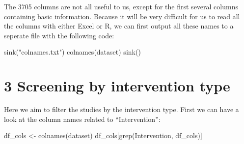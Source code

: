 \documentclass[
]{article}
\newenvironment{Shaded}{\begin{snugshade}}{\end{snugshade}}
\newcommand{\FunctionTok}[1]{\textcolor[rgb]{0.00,0.00,0.00}{#1}}
\newcommand{\NormalTok}[1]{#1}
\newcommand{\OtherTok}[1]{\textcolor[rgb]{0.56,0.35,0.01}{#1}}
\newcommand{\StringTok}[1]{\textcolor[rgb]{0.31,0.60,0.02}{#1}}
\begin{document}
The 3705 columns are not all useful to us, except for the first several
columns containing basic information. Because it will be very difficult
for us to read all the columns with either Excel or R, we can first
output all these names to a seperate file with the following code:

\begin{Shaded}
\begin{Highlighting}[]
\FunctionTok{sink}\NormalTok{(}\StringTok{"colnames.txt"}\NormalTok{)}
\FunctionTok{colnames}\NormalTok{(dataset)}
\FunctionTok{sink}\NormalTok{()}
\end{Highlighting}
\end{Shaded}

\hypertarget{screening-by-intervention-type}{%
\section{3 Screening by intervention
type}\label{screening-by-intervention-type}}

Here we aim to filter the studies by the intervention type. First we can
have a look at the column names related to ``Intervention'':

\begin{Shaded}
\begin{Highlighting}[]
\NormalTok{df\_cols }\OtherTok{\textless{}{-}} \FunctionTok{colnames}\NormalTok{(dataset)}
\NormalTok{df\_cols[}\FunctionTok{grep}\NormalTok{(}\StringTok{\textquotesingle{}Intervention\textquotesingle{}}\NormalTok{, df\_cols)]}
\end{Highlighting}
\end{Shaded}
\end{document}
